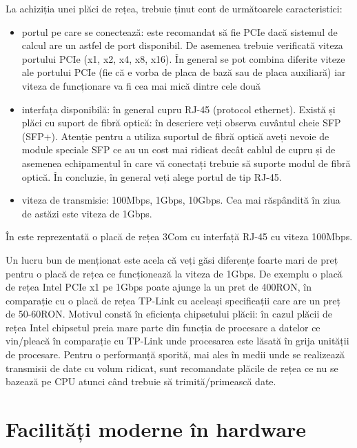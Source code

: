 La achiziția unei plăci de rețea, trebuie ținut cont de următoarele caracteristici:

\begin{itemize}
	\item portul pe care se conectează: este recomandat să fie PCIe dacă
		sistemul de calcul are un astfel de port disponibil. De asemenea
		trebuie verificată viteza portului PCIe (x1, x2, x4, x8, x16).
		În general se pot combina diferite viteze ale portului PCIe (fie
		că e vorba de placa de bază sau de placa auxiliară) iar viteza
		de funcționare va fi cea mai mică dintre cele două
	\item interfața disponibilă: în general cupru RJ-45 (protocol ethernet).
		Există și plăci cu suport de fibră optică: în descriere veți
		observa cuvântul cheie SFP  (SFP+). Atenție pentru a utiliza suportul
		de fibră optică aveți nevoie de module speciale SFP ce au un
		cost mai ridicat decât cablul de cupru și de asemenea
		echipamentul în care vă conectați trebuie să suporte modul de
		fibră optică. În concluzie, în general veți alege portul de tip
		RJ-45.
	\item viteza de transmisie: 100Mbps, 1Gbps, 10Gbps. Cea mai răspândită
		în ziua de astăzi este viteza de 1Gbps.
\end{itemize}

În  este reprezentată o placă de rețea 3Com cu interfață RJ-45 cu viteza 100Mbps.

Un lucru bun de menționat este acela că veți găsi diferențe foarte mari de preț
pentru o placă de rețea ce funcționează la viteza de 1Gbps. De exemplu o placă
de rețea Intel PCIe x1 pe 1Gbps poate ajunge la un pret de 400RON, în comparație
cu o placă de rețea TP-Link cu aceleași specificații care are un preț de
50-60RON. Motivul constă în eficiența chipsetului plăcii: în cazul plăcii de
rețea Intel chipsetul preia mare parte din funcția de procesare a datelor ce
vin/pleacă în comparație cu TP-Link unde procesarea este lăsată în grija
unității de procesare. Pentru o performanță sporită, mai ales în medii unde se
realizează transmisii de date cu volum ridicat, sunt recomandate plăcile de
rețea ce nu se bazează pe CPU atunci când trebuie să trimită/primească date.

\section{Facilități moderne în hardware}
\label{sec:hw:features}

